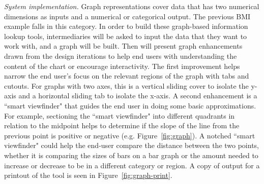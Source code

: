 \documentclass{sig-alternate}
\begin{document}

\emph{System implementation.}
Graph representations cover data that has two numerical dimensions as inputs and a numerical or categorical output. The previous BMI example falls in this category. In order to build these graph-based information lookup tools, intermediaries will be asked to input the data that they want to work with, and a graph will be built. Then \nifty will present graph enhancements drawn from the design iterations to help end users with understanding the content of the chart or encourage interactivity. 
The first improvement helps narrow the end user's focus on the relevant regions of the graph with tabs and cutouts. For graphs with two axes, this is a vertical sliding cover to isolate the y-axis and a horizontal sliding tab to isolate the x-axis. 
A second enhancement is a ``smart viewfinder" that guides the end user in doing some basic approximations. For example, sectioning the ``smart viewfinder" into different quadrants in relation to the midpoint helps to determine if the slope of the line from the previous point is positive or negative (e.g. Figure~\ref{fig:graph}). A notched ``smart viewfinder" could help the end-user compare the distance between the two points, whether it is comparing the sizes of bars on a bar graph or the amount needed to increase or decrease to be in a different category or region. A copy of output for a printout of the tool is seen in Figure~\ref{fig:graph-print}.
\end{document}
